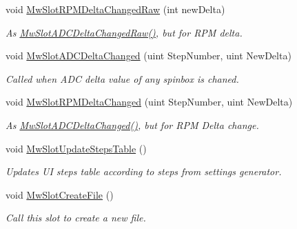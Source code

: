 \begin{DoxyCompactItemize}
void \hyperlink{class_main_window_a4480e7516f91b93c8abc3d42c1284124}{Mw\+Slot\+R\+P\+M\+Delta\+Changed\+Raw} (int new\+Delta)
\begin{DoxyCompactList}\small\item\em As \hyperlink{class_main_window_acbdfd3592779f6946c4fecc33c79e9a4}{Mw\+Slot\+A\+D\+C\+Delta\+Changed\+Raw()}, but for R\+PM delta. \end{DoxyCompactList}\item 
void \hyperlink{class_main_window_a5778840f76f8ce6edd63d84b57b801b1}{Mw\+Slot\+A\+D\+C\+Delta\+Changed} (uint Step\+Number, uint New\+Delta)
\begin{DoxyCompactList}\small\item\em Called when A\+DC delta value of any spinbox is chaned. \end{DoxyCompactList}\item 
void \hyperlink{class_main_window_a32b3a311b7151092db3ec0756d2c22d4}{Mw\+Slot\+R\+P\+M\+Delta\+Changed} (uint Step\+Number, uint New\+Delta)
\begin{DoxyCompactList}\small\item\em As \hyperlink{class_main_window_a5778840f76f8ce6edd63d84b57b801b1}{Mw\+Slot\+A\+D\+C\+Delta\+Changed()}, but for R\+PM Delta change. \end{DoxyCompactList}\item 
\mbox{\label{class_main_window_a07c8e8c9d91588bdcc8e1eae01c4ffd7}} 
void \hyperlink{class_main_window_a07c8e8c9d91588bdcc8e1eae01c4ffd7}{Mw\+Slot\+Update\+Steps\+Table} ()
\begin{DoxyCompactList}\small\item\em Updates UI steps table according to steps from settings generator. \end{DoxyCompactList}\item 
\mbox{\label{class_main_window_ab2bca26ed91446c16caebf7a93ae1334}} 
void \hyperlink{class_main_window_ab2bca26ed91446c16caebf7a93ae1334}{Mw\+Slot\+Create\+File} ()
\begin{DoxyCompactList}\small\item\em Call this slot to create a new file. \end{DoxyCompactList}\end{DoxyCompactItemize}
